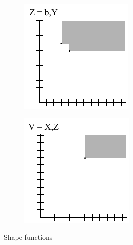 \documentclass[a4paper, 10pt]{article}
\begin{document}
\begin{figure}[H]
\begin{subfigure}{0.35\textwidth}
    \end{subfigure}
    \begin{subfigure}{0.35\textwidth}
        \centering
        \includegraphics[width=\linewidth]{3_sfz.pdf}
    \end{subfigure}
    \hfill
    \begin{subfigure}{0.35\textwidth}
        \centering
        \includegraphics[width=\linewidth]{3_sfv.pdf}
    \end{subfigure}
    \caption{Shape functions}
\end{figure}
\end{document}
